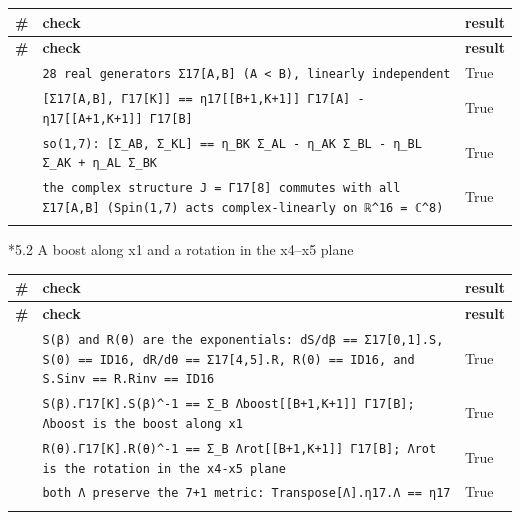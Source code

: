 \documentclass[10pt,a4paper]{article}
\makeatletter
\renewcommand\subsubsection{\@startsection{subsubsection}{3}{\z@}{-3.25ex\@plus -1ex \@minus -.2ex}{1.5ex \@plus .2ex}{\normalfont\normalsize\bfseries\raggedright}}
\makeatother
\begin{document}
{\footnotesize
\begin{longtable}{>{\raggedright\arraybackslash}p{}>{\raggedright\arraybackslash}p{}>{\raggedright\arraybackslash}p{}}
\toprule
\textbf{\#} & \textbf{check} & \textbf{result} \\
\midrule\endfirsthead
\toprule
\textbf{\#} & \textbf{check} & \textbf{result} \\
\midrule\endhead
\endfoot
\bottomrule\endlastfoot
105 & \texttt{28 real generators Σ17[A,B] (A < B), linearly independent} & True \\
106 & \texttt{[Σ17[A,B], Γ17[K]] == η17[[B+1,K+1]] Γ17[A] - η17[[A+1,K+1]] Γ17[B]} & True \\
107 & \texttt{so(1,7): [Σ\_\allowbreak{}AB, Σ\_\allowbreak{}KL] == η\_\allowbreak{}BK Σ\_\allowbreak{}AL - η\_\allowbreak{}AK Σ\_\allowbreak{}BL - η\_\allowbreak{}BL Σ\_\allowbreak{}AK + η\_\allowbreak{}AL Σ\_\allowbreak{}BK} & True \\
108 & \texttt{the complex structure J = Γ17[8] commutes with all Σ17[A,B] (Spin(1,7) acts complex-linearly on ℝ\textasciicircum{}16 = ℂ\textasciicircum{}8)} & True \\*
\end{longtable}}
\subsubsection*{5.2 A boost along x1 and a rotation in the x4–x5 plane}
{\footnotesize
\begin{longtable}{>{\raggedright\arraybackslash}p{}>{\raggedright\arraybackslash}p{}>{\raggedright\arraybackslash}p{}}
\toprule
\textbf{\#} & \textbf{check} & \textbf{result} \\
\midrule\endfirsthead
\toprule
\textbf{\#} & \textbf{check} & \textbf{result} \\
\midrule\endhead
\endfoot
\bottomrule\endlastfoot
109 & \texttt{S(β) and R(θ) are the exponentials: dS/\allowbreak{}dβ == Σ17[0,1].S, S(0) == ID16, dR/\allowbreak{}dθ == Σ17[4,5].R, R(0) == ID16, and S.Sinv == R.Rinv == ID16} & True \\
110 & \texttt{S(β).Γ17[K].S(β)\textasciicircum{}-1 == Σ\_\allowbreak{}B Λboost[[B+1,K+1]] Γ17[B]; Λboost is the boost along x1} & True \\
111 & \texttt{R(θ).Γ17[K].R(θ)\textasciicircum{}-1 == Σ\_\allowbreak{}B Λrot[[B+1,K+1]] Γ17[B]; Λrot is the rotation in the x4-x5 plane} & True \\
112 & \texttt{both Λ preserve the 7+1 metric: Transpose[Λ].η17.Λ == η17} & True \\*
\end{longtable}}
\end{document}
